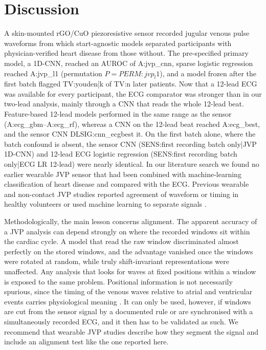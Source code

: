 \documentclass[11pt]{article}
\begin{document}
\section*{Discussion}
A skin-mounted rGO/CuO piezoresistive sensor recorded jugular venous pulse waveforms from which start-agnostic models separated participants with physician-verified heart disease from those without. The pre-specified primary model, a 1D-CNN, reached an AUROC of {{A:jvp_cnn}}, sparse logistic regression reached {{A:jvp_l1}} (permutation $P={{PERM:jvp_l1}}$), and a model frozen after the first batch flagged {{TV:youden|k}} of {{TV:n}} later patients. Now that a 12-lead ECG was available for every participant, the ECG comparator was stronger than in our two-lead analysis, mainly through a CNN that reads the whole 12-lead beat. Feature-based 12-lead models performed in the same range as the sensor ({{A:ecg_gbm}}--{{A:ecg_rf}}), whereas a CNN on the 12-lead beat reached {{A:ecg_best}}, and the sensor CNN {{DLSIG:cnn_ecgbest}} it. On the first batch alone, where the batch confound is absent, the sensor CNN ({{SENS:first recording batch only|JVP 1D-CNN}}) and 12-lead ECG logistic regression ({{SENS:first recording batch only|ECG LR 12-lead}}) were nearly identical. In our literature search we found no earlier wearable JVP sensor that had been combined with machine-learning classification of heart disease and compared with the ECG. Previous wearable and non-contact JVP studies reported agreement of waveform or timing in healthy volunteers \cite{amelard2017noncontact,garcialopez2020extracting,conroy2023jugular,karhinoja2023method,george2024jugular,george2025single} or used machine learning to separate signals \cite{cao2026unmixing}.

Methodologically, the main lesson concerns alignment. The apparent accuracy of a JVP analysis can depend strongly on where the recorded windows sit within the cardiac cycle. A model that read the raw window discriminated almost perfectly on the stored windows, and the advantage vanished once the windows were rotated at random, while truly shift-invariant representations were unaffected. Any analysis that looks for waves at fixed positions within a window is exposed to the same problem. Positional information is not necessarily spurious, since the timing of the venous waves relative to atrial and ventricular events carries physiological meaning \cite{applefeld1990jugular,chuachiaco2013jugular}. It can only be used, however, if windows are cut from the sensor signal by a documented rule or are synchronised with a simultaneously recorded ECG, and it then has to be validated as such. We recommend that wearable JVP studies describe how they segment the signal and include an alignment test like the one reported here.
\end{document}
